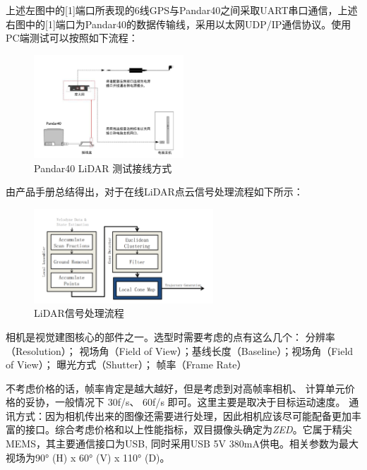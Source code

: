 上述左图中的[1]端口所表现的6线GPS与Pandar40之间采取UART串口通信，上述右图中的[1]端口为Pandar40的数据传输线，采用以太网UDP/IP通信协议。使用PC端测试可以按照如下流程：

\begin{figure}[H]
	\centering
	\includegraphics[width = 0.5\textwidth]{fig/LiDAR_test.png}
	\caption{Pandar40 LiDAR 测试接线方式}
	\label{LiDAR_test}
\end{figure}

由产品手册总结得出，对于在线LiDAR点云信号处理流程如下所示：

\begin{figure}[H]
	\centering
	\includegraphics[width = 0.6\textwidth]{fig/LiDAR_pipeline.png}
	\caption{LiDAR信号处理流程}
	\label{LiDAR_pipeline}
\end{figure}


相机是视觉建图核心的部件之一。选型时需要考虑的点有这么几个： 分辨率（Resolution）； 视场角（Field of View）；基线长度（Baseline）；视场角（Field of View）； 曝光方式（Shutter）； 帧率（Frame Rate）

不考虑价格的话，帧率肯定是越大越好，但是考虑到对高帧率相机、 计算单元价格的妥协，一般情况下 30f/s、 60f/s 即可。这里主要是取决于目标运动速度。 通讯方式：因为相机传出来的图像还需要进行处理，因此相机应该尽可能配备更加丰富的接口。综合考虑价格和以上性能指标，双目摄像头确定为\emph{ZED}。它属于精尖MEMS，其主要通信接口为USB, 同时采用USB 5V 380mA供电。相关参数为最大视场为90° (H) x 60° (V) x 110° (D)。

